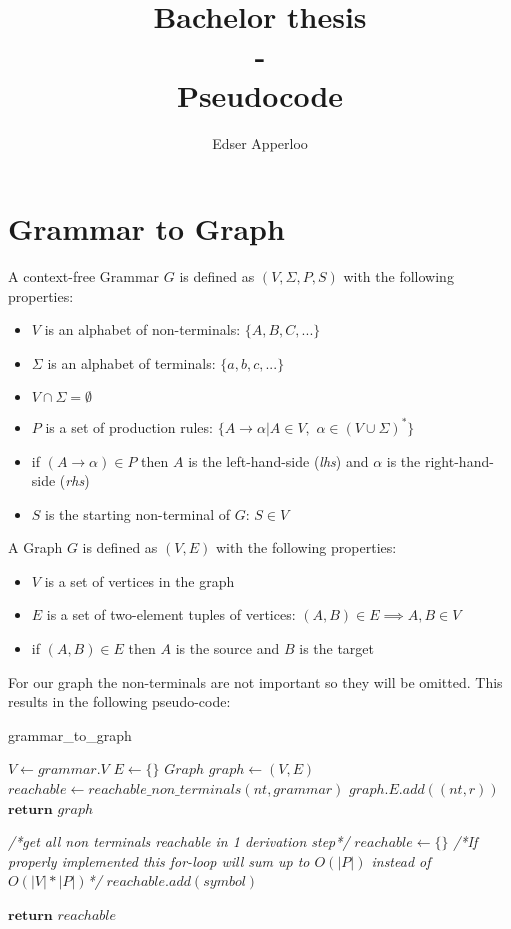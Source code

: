 \documentclass[]{article}
\title{Bachelor thesis \\- \\Pseudocode}
\author{Edser Apperloo}
\begin{document}
\maketitle

\section{Grammar to Graph}
A context-free Grammar $G$ is defined as $(V,\Sigma,P,S)$ with the following properties:
\begin{itemize}
	\item $V$ is an alphabet of non-terminals: $\{A, B, C, ...\}$
	\item $\Sigma$ is an alphabet of terminals: $\{a, b, c, ...\}$
	\item $V \cap \Sigma = \emptyset$
	\item $P$ is a set of production rules: $\{A \to \alpha | A \in V,$ $ \alpha \in (V \cup \Sigma)^*\}$
	\item if $(A \to \alpha) \in P$ then $A$ is the left-hand-side (\textit{lhs}) and $\alpha$ is the right-hand-side (\textit{rhs})
	\item $S$ is the starting non-terminal of $G$: $S \in V$\\
\end{itemize}
A Graph $G$ is defined as $(V, E)$ with the following properties:
\begin{itemize}
	\item $V$ is a set of vertices in the graph
	\item $E$ is a set of two-element tuples of vertices: $(A, B) \in E \implies A,B \in V$
	\item if $(A,B) \in E$ then $A$ is the source and $B$ is the target\\
\end{itemize}
\newpage
\noindent For our graph the non-terminals are not important so they will be omitted. This results in the following pseudo-code:\\

\begin{algorithm}
	\caption{grammar\_to\_graph}\label{grammar_to_graph}
	\begin{algorithmic}[1]
		\State $V \gets grammar.V$
		\State $E \gets \{\}$
		\State $Graph$ $graph \gets (V, E)$
			\State $reachable \gets reachable\_non\_terminals(nt, grammar)$
				\State $graph.E.add((nt, r))$
			\EndFor
		\EndFor
		\State $\textbf{return}$ $graph$
		\EndProcedure
		
		\State
		
		\State\textit{/*get all non terminals reachable in 1 derivation step*/}
		\State $reachable \gets \{\}$
		\State \textit{/*If properly implemented this for-loop will sum up to $O(|P|)$ instead of $O(|V| * |P|)$*/}
				\State $reachable.add(symbol)$			
			\EndFor
		\EndFor


		\State $\textbf{return}$ $reachable$
		\EndProcedure
	\end{algorithmic}
\end{algorithm}
\end{document}
